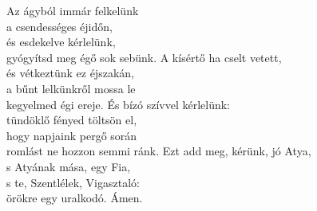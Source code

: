 \documentclass[twoside]{article}
\begin{document}
\begin{hymnstanzas}
    Az ágyból immár felkelünk\\
    a csendességes éjidőn,\\
    és esdekelve kérlelünk,\\
    gyógyítsd meg égő sok sebünk.
\stanzabreak
    A kísértő ha cselt vetett,\\
    és vétkeztünk ez éjszakán,\\
    a bűnt lelkünkről mossa le\\
    kegyelmed égi ereje.
\stanzabreak
    És bízó szívvel kérlelünk:\\
    tündöklő fényed töltsön el,\\
    hogy napjaink pergő során\\
    romlást ne hozzon semmi ránk.
\stanzabreak
    Ezt add meg, kérünk, jó Atya,\\
    s Atyának mása, egy Fia,\\
    s te, Szentlélek, Vigasztaló:\\
    örökre egy uralkodó. Ámen.
\end{hymnstanzas}



\end{document}
